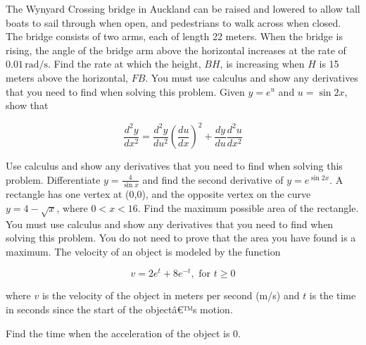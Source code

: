 \documentclass[12pt,addpoints]{exam}
\begin{document}
\begin{questions}
\fillwithlines{5cm}
\question[5] The Wynyard Crossing bridge in Auckland can be raised and lowered to allow tall boats to sail through when open, and pedestrians to walk across when closed. The bridge consists of two arms, each of length 22 meters. When the bridge is rising, the angle of the bridge arm above the horizontal increases at the rate of \(0.01 \, \text{rad/s}\). Find the rate at which the height, \(BH\), is increasing when \(H\) is 15 meters above the horizontal, \(FB\). You must use calculus and show any derivatives that you need to find when solving this problem.
\fillwithlines{5cm}
\question[5] Given \( y = e^u \) and \( u = \sin 2x \), show that

\[
\frac{d^2 y}{dx^2} = \frac{d^2 y}{du^2} \left( \frac{du}{dx} \right)^2 + \frac{dy}{du} \frac{d^2 u}{dx^2}
\]

Use calculus and show any derivatives that you need to find when solving this problem.
\fillwithlines{5cm}
\question[5] Differentiate \( y = \frac{4}{\sin x} \) and find the second derivative of \( y = e^{\sin 2x} \).
\fillwithlines{5cm}
\question[5] A rectangle has one vertex at (0,0), and the opposite vertex on the curve \( y = 4 - \sqrt{x} \), where \( 0 < x < 16 \). Find the maximum possible area of the rectangle. You must use calculus and show any derivatives that you need to find when solving this problem. You do not need to prove that the area you have found is a maximum.
\fillwithlines{5cm}
\question[5] The velocity of an object is modeled by the function

\[ v = 2e^t + 8e^{-t}, \text{ for } t \geq 0 \]

where \( v \) is the velocity of the object in meters per second (m/s) and \( t \) is the time in seconds since the start of the objectâ€™s motion.

Find the time when the acceleration of the object is 0.


\end{questions}
\end{document}
